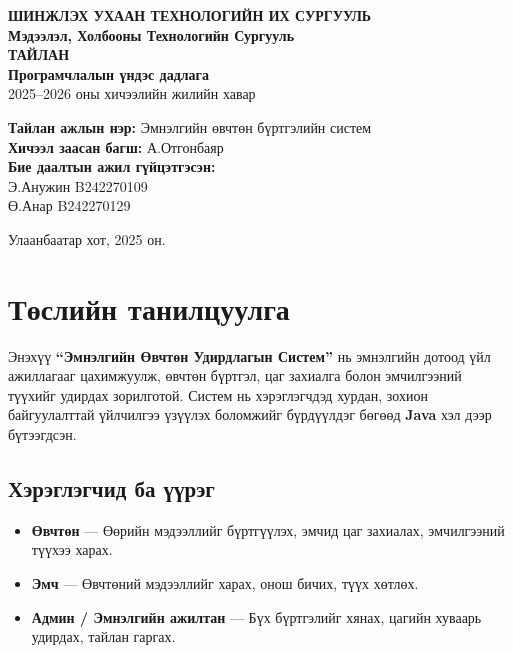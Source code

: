 \documentclass[12pt]{article}
\begin{document}
\begin{center}
\textbf{ШИНЖЛЭХ УХААН ТЕХНОЛОГИЙН ИХ СУРГУУЛЬ} \\[0.5cm]
\textbf{Мэдээлэл, Холбооны Технологийн Сургууль} \\[4cm]

\textbf{\Large ТАЙЛАН} \\[0.5cm]
\textbf{Програмчлалын үндэс дадлага} \\[0.5cm]
2025–2026 оны хичээлийн жилийн хавар \\[2cm]
\end{center}

\vspace{1cm}

\noindent\textbf{Тайлан ажлын нэр:} \hspace{1cm} Эмнэлгийн өвчтөн бүртгэлийн систем \\[0.5cm]
\textbf{Хичээл заасан багш:} \hspace{1cm} А.Отгонбаяр \\[0.5cm]
\textbf{Бие даалтын ажил гүйцэтгэсэн:} \\
\hspace{1cm} Э.Анужин B242270109 \\
\hspace{1cm} Ө.Анар B242270129 \\

\vfill

\begin{center}
Улаанбаатар хот, 2025 он.
\end{center}

\newpage

\section*{Төслийн танилцуулга}

Энэхүү \textbf{“Эмнэлгийн Өвчтөн Удирдлагын Систем”} нь эмнэлгийн дотоод үйл ажиллагааг цахимжуулж, өвчтөн бүртгэл, цаг захиалга болон эмчилгээний түүхийг удирдах зорилготой. Систем нь хэрэглэгчдэд хурдан, зохион байгуулалттай үйлчилгээ үзүүлэх боломжийг бүрдүүлдэг бөгөөд \textbf{Java} хэл дээр бүтээгдсэн.

\subsection*{Хэрэглэгчид ба үүрэг}

\begin{itemize}
  \item \textbf{Өвчтөн} — Өөрийн мэдээллийг бүртгүүлэх, эмчид цаг захиалах, эмчилгээний түүхээ харах.
  \item \textbf{Эмч} — Өвчтөний мэдээллийг харах, онош бичих, түүх хөтлөх.
  \item \textbf{Админ / Эмнэлгийн ажилтан} — Бүх бүртгэлийг хянах, цагийн хуваарь удирдах, тайлан гаргах.
\end{itemize}
\end{document}
